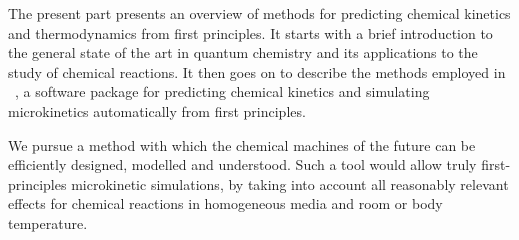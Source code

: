 The present part presents an overview of methods for predicting chemical
kinetics and thermodynamics from first principles.
It starts with a brief introduction to the general state of the art in quantum
chemistry and its applications to the study of chemical reactions.
It then goes on to describe the methods employed in
\overreact~\cite{Schneider2022}, a software
package for predicting chemical kinetics and simulating microkinetics
automatically from first principles.

We pursue a method with which the chemical machines of the future can be efficiently designed, modelled and understood.
Such a tool would allow truly first-principles microkinetic simulations,
by taking into account all reasonably relevant effects for chemical reactions in homogeneous media and room or body temperature.
